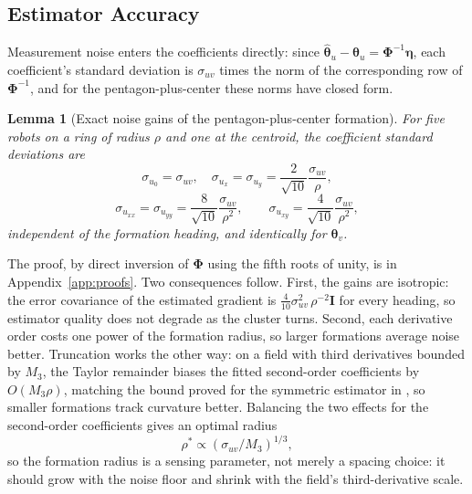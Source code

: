 \documentclass[lettersize,journal]{IEEEtran}
\newtheorem{lemma}{Lemma}
\begin{document}
\subsection{Estimator Accuracy}
\label{sec:sensitivity}

Measurement noise enters the coefficients directly: since
$\hat{\boldsymbol{\theta}}_u - \boldsymbol{\theta}_u =
\boldsymbol{\Phi}^{-1}\boldsymbol{\eta}$, each coefficient's standard
deviation is $\sigma_{uv}$ times the norm of the corresponding row of
$\boldsymbol{\Phi}^{-1}$, and for the pentagon-plus-center these norms
have closed form.

\begin{lemma}[Exact noise gains of the pentagon-plus-center formation]
\label{lem:gains}
For five robots on a ring of radius $\rho$ and one at the centroid, the
coefficient standard deviations are
\begin{equation}
    \sigma_{u_0} = \sigma_{uv}, \quad
    \sigma_{u_x} = \sigma_{u_y} = \frac{2}{\sqrt{10}}\frac{\sigma_{uv}}{\rho},
    \label{eq:gain_grad}
\end{equation}
\begin{equation}
    \sigma_{u_{xx}} = \sigma_{u_{yy}} = \frac{8}{\sqrt{10}}
    \frac{\sigma_{uv}}{\rho^2},
    \qquad
    \sigma_{u_{xy}} = \frac{4}{\sqrt{10}}\frac{\sigma_{uv}}{\rho^2},
    \label{eq:gain_hess}
\end{equation}
independent of the formation heading, and identically for
$\boldsymbol{\theta}_v$.
\end{lemma}

The proof, by direct inversion of $\boldsymbol{\Phi}$ using the fifth
roots of unity, is in Appendix~\ref{app:proofs}. Two consequences
follow. First, the gains are isotropic: the error covariance of the
estimated gradient is $\tfrac{4}{10}\sigma_{uv}^2\,\rho^{-2}\mathbf{I}$
for every heading, so estimator quality does not degrade as the cluster
turns. Second, each derivative order costs one power of the formation
radius, so larger formations average noise better. Truncation works the
other way: on a field with third derivatives bounded by $M_3$, the
Taylor remainder biases the fitted second-order coefficients by $O(M_3
\rho)$, matching the bound proved for the symmetric estimator in
\cite{15}, so smaller formations track curvature better. Balancing the
two effects for the second-order coefficients gives an optimal radius
\begin{equation}
    \rho^* \propto \left(\sigma_{uv}/M_3\right)^{1/3},
    \label{eq:rho_star}
\end{equation}
so the formation radius is a sensing parameter, not merely a spacing
choice: it should grow with the noise floor and shrink with the field's
third-derivative scale.
\end{document}
